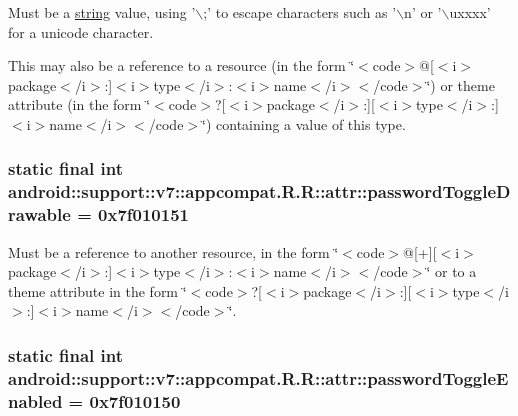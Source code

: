 Must be a \hyperlink{classandroid_1_1support_1_1v7_1_1appcompat_1_1_r_1_1string}{string} value, using '$\backslash$;' to escape characters such as '$\backslash$n' or '$\backslash$uxxxx' for a unicode character. 

This may also be a reference to a resource (in the form \char`\"{}$<$code$>$@\mbox{[}$<$i$>$package$<$/i$>$:\mbox{]}$<$i$>$type$<$/i$>$:$<$i$>$name$<$/i$>$$<$/code$>$\char`\"{}) or theme attribute (in the form \char`\"{}$<$code$>$?\mbox{[}$<$i$>$package$<$/i$>$:\mbox{]}\mbox{[}$<$i$>$type$<$/i$>$:\mbox{]}$<$i$>$name$<$/i$>$$<$/code$>$\char`\"{}) containing a value of this type. \hypertarget{classandroid_1_1support_1_1v7_1_1appcompat_1_1_r_1_1attr_b4fea9de407efba12f9e52dbd9cbc277}{
\subsubsection[{passwordToggleDrawable}]{\setlength{\rightskip}{0pt plus 5cm}static final int android::support::v7::appcompat.R.R::attr::passwordToggleDrawable = 0x7f010151}}
\label{classandroid_1_1support_1_1v7_1_1appcompat_1_1_r_1_1attr_b4fea9de407efba12f9e52dbd9cbc277}


Must be a reference to another resource, in the form \char`\"{}$<$code$>$@\mbox{[}+\mbox{]}\mbox{[}$<$i$>$package$<$/i$>$:\mbox{]}$<$i$>$type$<$/i$>$:$<$i$>$name$<$/i$>$$<$/code$>$\char`\"{} or to a theme attribute in the form \char`\"{}$<$code$>$?\mbox{[}$<$i$>$package$<$/i$>$:\mbox{]}\mbox{[}$<$i$>$type$<$/i$>$:\mbox{]}$<$i$>$name$<$/i$>$$<$/code$>$\char`\"{}. \hypertarget{classandroid_1_1support_1_1v7_1_1appcompat_1_1_r_1_1attr_056ea0d01d047a8a2e3c7410ec144448}{
\subsubsection[{passwordToggleEnabled}]{\setlength{\rightskip}{0pt plus 5cm}static final int android::support::v7::appcompat.R.R::attr::passwordToggleEnabled = 0x7f010150}}
\label{classandroid_1_1support_1_1v7_1_1appcompat_1_1_r_1_1attr_056ea0d01d047a8a2e3c7410ec144448}



